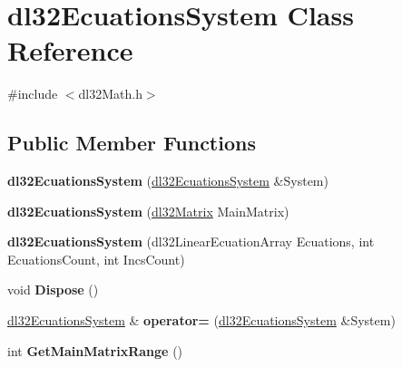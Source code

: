 \hypertarget{classdl32_ecuations_system}{\section{dl32\-Ecuations\-System Class Reference}
\label{classdl32_ecuations_system}
}


{\ttfamily \#include $<$dl32\-Math.\-h$>$}

\subsection*{Public Member Functions}
\begin{DoxyCompactItemize}
\item 
\hypertarget{classdl32_ecuations_system_ac70eeb80fb02ece80271c3c24dd73f1d}{{\bfseries dl32\-Ecuations\-System} (\hyperlink{classdl32_ecuations_system}{dl32\-Ecuations\-System} \&System)}\label{classdl32_ecuations_system_ac70eeb80fb02ece80271c3c24dd73f1d}

\item 
\hypertarget{classdl32_ecuations_system_af1e35afd9bbec7289ccd7b2d458b78e1}{{\bfseries dl32\-Ecuations\-System} (\hyperlink{classdl32_matrix}{dl32\-Matrix} Main\-Matrix)}\label{classdl32_ecuations_system_af1e35afd9bbec7289ccd7b2d458b78e1}

\item 
\hypertarget{classdl32_ecuations_system_a258de156641e1d19548634ec3379f483}{{\bfseries dl32\-Ecuations\-System} (dl32\-Linear\-Ecuation\-Array Ecuations, int Ecuations\-Count, int Incs\-Count)}\label{classdl32_ecuations_system_a258de156641e1d19548634ec3379f483}

\item 
\hypertarget{classdl32_ecuations_system_a3d9ef8b3ec474a0e4a5c9ce1c8e44b9e}{void {\bfseries Dispose} ()}\label{classdl32_ecuations_system_a3d9ef8b3ec474a0e4a5c9ce1c8e44b9e}

\item 
\hypertarget{classdl32_ecuations_system_a7651aad20055ed634c08f04470927972}{\hyperlink{classdl32_ecuations_system}{dl32\-Ecuations\-System} \& {\bfseries operator=} (\hyperlink{classdl32_ecuations_system}{dl32\-Ecuations\-System} \&System)}\label{classdl32_ecuations_system_a7651aad20055ed634c08f04470927972}

\item 
\hypertarget{classdl32_ecuations_system_a05cf02fe67949b831c927d85461f2916}{int {\bfseries Get\-Main\-Matrix\-Range} ()}\label{classdl32_ecuations_system_a05cf02fe67949b831c927d85461f2916}


\end{DoxyCompactItemize}
